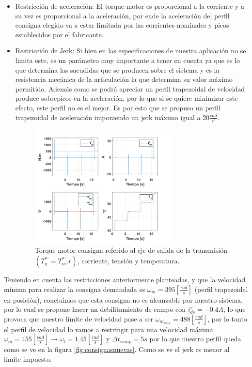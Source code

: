 \documentclass[10pt]{article}
\begin{document}
\begin{itemize}
\begin{itemize}
	 \item Restricción de aceleración: El torque motor es proporcional a la corriente y a su vez es proporcional a la aceleración, por ende la aceleración del perfil consigna elegido
	 va a estar limitada por las corrientes nominales y picos establecidos por el fabricante.

	 \item Restricción de Jerk: Si bien en las especificaciones de nuestra aplicación no se limita este, es un parámetro muy importante a tener en cuenta ya que es lo que determina las sacudidas 
	 que se producen sobre el sistema y es la resistencia mecánica de la articulación la que determina su valor máximo permitido. Además como se podrá apreciar un perfil trapezoidal de velocidad
	 produce sobrepicos en la aceleración, por lo que si se quiere minimizar este efecto, este perfil no es el mejor. Es por esto que se propuso un perfil trapezoidal de aceleración imponiendo un jerk máximo igual a $20 \frac{rad}{s^{3}}$.
\begin{figure}[h!]
	\centering
	\includegraphics[width=0.7\textwidth]{parametros.png}
	\caption{\label{fig:parametros}Torque motor consigna referido al eje de salida de la transmisión $(T^{*'}_{q}=T^{*'}_{m}.r)$, corriente, tensión y temperatura.}
	\end{figure}
 \end{itemize}

 Teniendo en cuenta las restricciones anteriormente planteadas, y que la velocidad mínima para realizar la consigna demandada es $\omega_{m}=395[\frac{rad}{s}]$ (perfil trapezoidal en posición), concluimos que esta consigna no es alcanzable
 por nuestro sistema, por lo cual se propone hacer un debilitamiento
 de campo con $i^{r}_{ds}=-0.4A$, lo que provoca que nuestro límite de velocidad pase a ser $\omega_{m_{max}}=488[\frac{rad}{s}]$, por lo tanto el perfil de velocidad lo vamos a restringir para una velocidad máxima $\omega_{m}=455[\frac{rad}{s}]\rightarrow \omega_{l}=1.45[\frac{rad}{s}]$ y 
 $\Delta t_{ramp}=5s$ por lo que nuestro perfil queda como se ve en la figura \ref{fig:consignasnuevas}. Como se ve el jerk es menor al límite impuesto.
 

\end{itemize}
\end{document}
